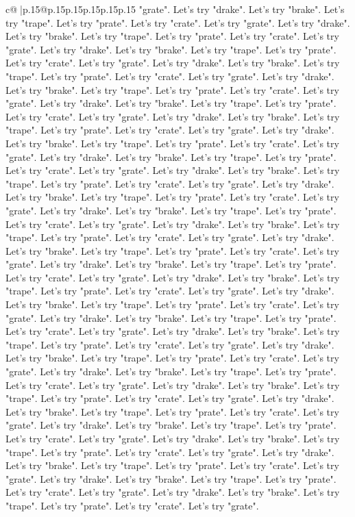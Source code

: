 \documentclass{article}
\begin{document}
{\begin{supertabular}{c@{$\;$}|p{.15\linewidth}@{}p{.15\linewidth}p{.15\linewidth}p{.15\linewidth}p{.15\linewidth}p{.15\linewidth}}
{{{"grate". Let's try "drake". Let's try "brake". Let's try "trape". Let's try "prate". Let's try "crate". Let's try "grate". Let's try "drake". Let's try "brake". Let's try "trape". Let's try "prate". Let's try "crate". Let's try "grate". Let's try "drake". Let's try "brake". Let's try "trape". Let's try "prate". Let's try "crate". Let's try "grate". Let's try "drake". Let's try "brake". Let's try "trape". Let's try "prate". Let's try "crate". Let's try "grate". Let's try "drake". Let's try "brake". Let's try "trape". Let's try "prate". Let's try "crate". Let's try "grate". Let's try "drake". Let's try "brake". Let's try "trape". Let's try "prate". Let's try "crate". Let's try "grate". Let's try "drake". Let's try "brake". Let's try "trape". Let's try "prate". Let's try "crate". Let's try "grate". Let's try "drake". Let's try "brake". Let's try "trape". Let's try "prate". Let's try "crate". Let's try "grate". Let's try "drake". Let's try "brake". Let's try "trape". Let's try "prate". Let's try "crate". Let's try "grate". Let's try "drake". Let's try "brake". Let's try "trape". Let's try "prate". Let's try "crate". Let's try "grate". Let's try "drake". Let's try "brake". Let's try "trape". Let's try "prate". Let's try "crate". Let's try "grate". Let's try "drake". Let's try "brake". Let's try "trape". Let's try "prate". Let's try "crate". Let's try "grate". Let's try "drake". Let's try "brake". Let's try "trape". Let's try "prate". Let's try "crate". Let's try "grate". Let's try "drake". Let's try "brake". Let's try "trape". Let's try "prate". Let's try "crate". Let's try "grate". Let's try "drake". Let's try "brake". Let's try "trape". Let's try "prate". Let's try "crate". Let's try "grate". Let's try "drake". Let's try "brake". Let's try "trape". Let's try "prate". Let's try "crate". Let's try "grate". Let's try "drake". Let's try "brake". Let's try "trape". Let's try "prate". Let's try "crate". Let's try "grate". Let's try "drake". Let's try "brake". Let's try "trape". Let's try "prate". Let's try "crate". Let's try "grate". Let's try "drake". Let's try "brake". Let's try "trape". Let's try "prate". Let's try "crate". Let's try "grate". Let's try "drake". Let's try "brake". Let's try "trape". Let's try "prate". Let's try "crate". Let's try "grate". Let's try "drake". Let's try "brake". Let's try "trape". Let's try "prate". Let's try "crate". Let's try "grate". Let's try "drake". Let's try "brake". Let's try "trape". Let's try "prate". Let's try "crate". Let's try "grate". Let's try "drake". Let's try "brake". Let's try "trape". Let's try "prate". Let's try "crate". Let's try "grate". Let's try "drake". Let's try "brake". Let's try "trape". Let's try "prate". Let's try "crate". Let's try "grate". Let's try "drake". Let's try "brake". Let's try "trape". Let's try "prate". Let's try "crate". Let's try "grate". Let's try "drake". Let's try "brake". Let's try "trape". Let's try "prate". Let's try "crate". Let's try "grate". Let's try "drake". Let's try "brake". Let's try "trape". Let's try "prate". Let's try "crate". Let's try "grate". Let's try "drake". Let's try "brake". Let's try "trape". Let's try "prate". Let's try "crate". Let's try "grate". }}}
\end{supertabular}}
\end{document}
